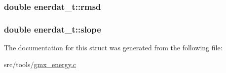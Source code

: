 \hypertarget{structenerdat__t_a5c9ea99e02c773fa0722139e3a5ae35d}{
\subsubsection[{rmsd}]{\setlength{\rightskip}{0pt plus 5cm}double {\bf enerdat\-\_\-t\-::rmsd}}}\label{structenerdat__t_a5c9ea99e02c773fa0722139e3a5ae35d}
\hypertarget{structenerdat__t_ab944e034a27698f10029e1b35450bd32}{
\subsubsection[{slope}]{\setlength{\rightskip}{0pt plus 5cm}double {\bf enerdat\-\_\-t\-::slope}}}\label{structenerdat__t_ab944e034a27698f10029e1b35450bd32}


\-The documentation for this struct was generated from the following file\-:\begin{DoxyCompactItemize}
\item 
src/tools/\hyperlink{gmx__energy_8c}{gmx\-\_\-energy.\-c}\end{DoxyCompactItemize}
